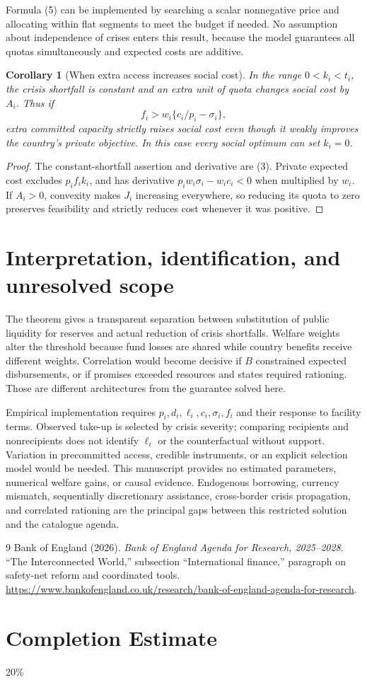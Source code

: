\documentclass[11pt,a4paper]{article}
\newtheorem{corollary}[theorem]{Corollary}
\theoremstyle{definition}
\theoremstyle{remark}
\begin{document}
Formula (5) can be implemented by searching a scalar nonnegative price and allocating within flat segments to meet the budget if needed. No assumption about independence of crises enters this result, because the model guarantees all quotas simultaneously and expected costs are additive.

\begin{corollary}[When extra access increases social cost]
In the range $0<k_i<t_i$, the crisis shortfall is constant and an extra unit of quota changes social cost by $A_i$. Thus if
\[
 f_i>w_i\{c_i/p_i-\sigma_i\},
\]
extra committed capacity strictly raises social cost even though it weakly improves the country's private objective. In this case every social optimum can set $k_i=0$.
\end{corollary}
\begin{proof}
The constant-shortfall assertion and derivative are (3). Private expected cost excludes $p_if_ik_i$, and has derivative $p_iw_i\sigma_i-w_ic_i<0$ when multiplied by $w_i$. If $A_i>0$, convexity makes $J_i$ increasing everywhere, so reducing its quota to zero preserves feasibility and strictly reduces cost whenever it was positive.
\end{proof}

\section{Interpretation, identification, and unresolved scope}
The theorem gives a transparent separation between substitution of public liquidity for reserves and actual reduction of crisis shortfalls. Welfare weights alter the threshold because fund losses are shared while country benefits receive different weights. Correlation would become decisive if $B$ constrained expected disbursements, or if promises exceeded resources and states required rationing. Those are different architectures from the guarantee solved here.

Empirical implementation requires $p_i,d_i,\ell_i,c_i,\sigma_i,f_i$ and their response to facility terms. Observed take-up is selected by crisis severity; comparing recipients and nonrecipients does not identify $\ell_i$ or the counterfactual without support. Variation in precommitted access, credible instruments, or an explicit selection model would be needed. This manuscript provides no estimated parameters, numerical welfare gains, or causal evidence. Endogenous borrowing, currency mismatch, sequentially discretionary assistance, cross-border crisis propagation, and correlated rationing are the principal gaps between this restricted solution and the catalogue agenda.
\begin{thebibliography}{9}
 Bank of England (2026).
\emph{Bank of England Agenda for Research, 2025--2028}.
``The Interconnected World,'' subsection ``International finance,'' paragraph on safety-net reform and coordinated tools.
\url{https://www.bankofengland.co.uk/research/bank-of-england-agenda-for-research}.
\end{thebibliography}

\section{Completion Estimate}
20\%
\end{document}
